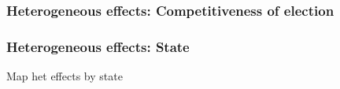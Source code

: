 \documentclass{beamer}
\begin{document}
\begin{frame}
\frametitle{Heterogeneous effects: Competitiveness of election}


\end{frame}


\begin{frame}
\frametitle{Heterogeneous effects: State}

Map het effects by state

\end{frame}


%
%
%
%
%
%
%
%
%
%
%
%
%
\end{document}
